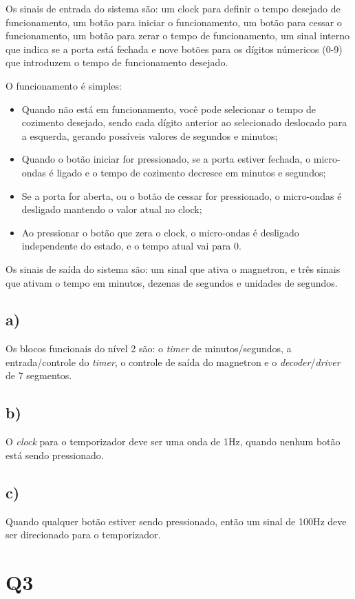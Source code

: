 \documentclass[12pt]{article}
\begin{document}
Os sinais de entrada do sistema são: um clock para definir o tempo desejado de  funcionamento, um botão para iniciar o funcionamento, um botão para cessar o funcionamento, um botão para zerar o tempo de funcionamento, um sinal interno que indica se a porta está fechada e nove botões para os dígitos númericos (0-9) que introduzem o tempo de funcionamento desejado.


O funcionamento é simples:

\begin{center}
	\begin{itemize}
		\item Quando não está em funcionamento, você pode selecionar o tempo de cozimento desejado, sendo cada dígito anterior ao selecionado deslocado para a esquerda, gerando possíveis valores de segundos e minutos;
		\item Quando o botão iniciar for pressionado, se a porta estiver fechada, o micro-ondas é ligado e o tempo de cozimento decresce em minutos e segundos;
		\item Se a porta for aberta, ou o botão de cessar for pressionado, o micro-ondas é desligado mantendo o valor atual no clock;
		\item Ao pressionar o botão que zera o clock, o micro-ondas é desligado independente do estado, e o tempo atual vai para 0.
	\end{itemize}
\end{center}

Os sinais de saída do sistema são: um sinal que ativa o magnetron, e três sinais que ativam o tempo em minutos, dezenas de segundos e unidades de segundos.


\subsection*{a)} Os blocos funcionais do nível 2 são: o \textit{timer} de minutos/segundos, a entrada/controle do \textit{timer}, o controle de saída do magnetron e o \textit{decoder}/\textit{driver} de 7 segmentos.

\subsection*{b)} O \textit{clock} para o temporizador deve ser uma onda de 1Hz, quando nenhum botão está sendo pressionado.

\subsection*{c)} Quando qualquer botão estiver sendo pressionado, então um sinal de 100Hz deve ser direcionado para o temporizador.


\section*{Q3}
\end{document}
